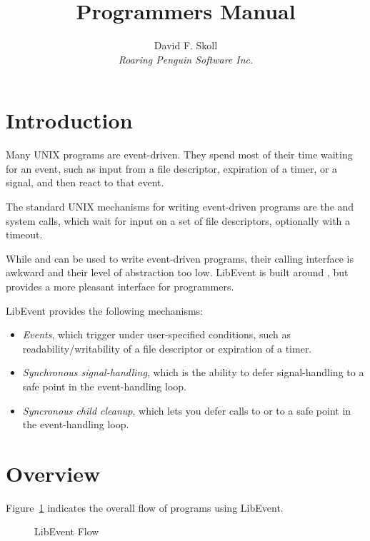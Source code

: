 \documentclass{article}
\title{\Le{} Programmers Manual}
\author{David F. Skoll\\\textit{Roaring Penguin Software Inc.}}
\newcommand{\Le}{\textsf{LibEvent}}
\begin{document}
\maketitle

\section{Introduction}
\label{sec:introduction}

Many UNIX programs are event-driven.  They spend most of their time
waiting for an event, such as input from a file descriptor, expiration
of a timer, or a signal, and then react to that event.

The standard UNIX mechanisms for writing event-driven programs are
the  and  system calls, which wait for input
on a set of file descriptors, optionally with a timeout.

While  and  can be used to write event-driven
programs, their calling interface is awkward and their level of
abstraction too low.  \Le{} is built around , but
provides a more pleasant interface for programmers.

\Le{} provides the following mechanisms:
\begin{itemize}
\item \textit{Events}, which trigger under user-specified conditions,
  such as readability/writability of a file descriptor or expiration of
  a timer.
\item \textit{Synchronous signal-handling}, which is the ability to
  defer signal-handling to a safe point in the event-handling loop.
\item \textit{Syncronous child cleanup}, which lets you defer calls
  to  or  to a safe point in the event-handling
  loop.
\end{itemize}

\section{Overview}
\label{sec:overview}

Figure~\ref{fig:flow} indicates the overall flow of programs using
\Le{}.
\begin{figure}[htbp]
  \begin{center}
    \caption{\Le{} Flow}
    \label{fig:flow}
  \end{center}
\end{figure}
\end{document}
